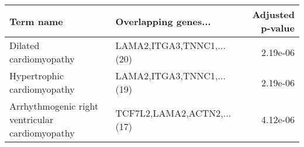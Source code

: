 \begin{tabular}{llr}
\toprule
                                      Term name &       Overlapping genes... &  Adjusted p-value \\
\midrule
                         Dilated cardiomyopathy &  LAMA2,ITGA3,TNNC1,...(20) &          2.19e-06 \\
                    Hypertrophic cardiomyopathy &  LAMA2,ITGA3,TNNC1,...(19) &          2.19e-06 \\
Arrhythmogenic right ventricular cardiomyopathy & TCF7L2,LAMA2,ACTN2,...(17) &          4.12e-06 \\
\bottomrule
\end{tabular}
